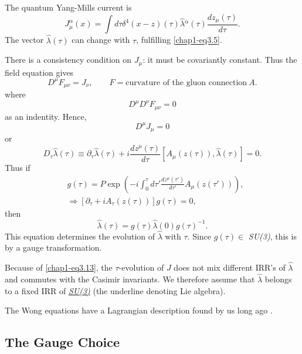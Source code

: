 The quantum Yang-Mills current is
\begin{equation}
J_\mu^\alpha (x) = \int d \tau \delta^4 (x -z) (\tau) \hat{\lambda} {}^\alpha (\tau) \frac{dz_\mu (\tau)}{d \tau}. \label{chap1-eq3.6}
\end{equation}
The vector $\hat{\lambda} (\tau)$ can change with $\tau$, fulfilling \eqref{chap1-eq3.5}.

There is a consistency condition on $J_\mu$: it must be covariantly constant. Thus the field equation gives
\begin{equation}
D^\mu F_{\mu \nu} = J_\nu, \qquad F= \text{curvature of the gluon connection}~ A. \label{chap1-eq3.7}
\end{equation}
where
\begin{equation}
D^\mu D^\nu F_{\mu \nu}=0 \label{chap1-eq3.8}
\end{equation}
as an indentity. Hence,
\begin{equation}
D^\mu J_\mu =0 \label{chap1-eq3.9}
\end{equation}
or
\begin{equation}
D_\tau \hat{\lambda} (\tau) \equiv \partial_\tau \hat{\lambda} (\tau) + i \frac{dz^\mu(\tau)}{d \tau} \left[A_\mu (z(\tau)), \hat{\lambda}(\tau)\right] =0. \label{chap1-eq3.10}
\end{equation}
Thus if
\begin{align}
  & g(\tau) = P \exp \left(-i \int^\tau_0 d \tau' \frac{dz^\mu(\tau')}{d \tau'} A_\mu (z(\tau')) \right), \label{chap1-eq3.11}\\
  & \Longrightarrow [\partial_\tau +i A_\tau (z(\tau))] g (\tau)=0, \label{chap1-eq3.12}
\end{align}
then
\begin{equation}
\hat{\lambda} (\tau) = g (\tau) \hat{\lambda} (0) g (\tau)^{-1}. \label{chap1-eq3.13}
\end{equation}
This equation determines the evolution of $\hat{\lambda}$ with $\tau$. Since $g(\tau) \in$ \textit{SU(3)}, this is by a gauge transformation.

Because of \eqref{chap1-eq3.13}, the $\tau$-evolution of $J$ does not mix different IRR's of $\hat{\lambda}$ and commutes with the Casimir invariants. We therefore assume that $\hat{\lambda}$ belongs to a fixed IRR of \underline{\textit{SU(3)}} (the underline denoting Lie algebra).

The Wong equations have a Lagrangian description found by us long ago \cite{key12}.

\subsection{The Gauge Choice}\label{chap1-sec3.1}

